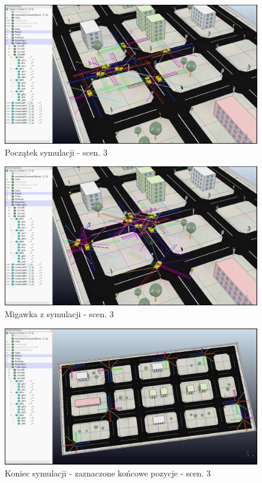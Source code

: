  \begin{figure}[H]
 	\centering
 	\centering
 	\includegraphics[width=.8\linewidth]{p31.jpg}
 	\caption{Początek symulacji - scen. 3}
 	\label{fig:p31}
 \end{figure}

 \begin{figure}[H]
	\centering
	\centering
	\includegraphics[width=.8\linewidth]{p32.jpg}
	\caption{Migawka z symulacji - scen. 3}
	\label{fig:p32}
\end{figure}

 \begin{figure}[H]
	\centering
	\centering
	\includegraphics[width=.8\linewidth]{p33.jpg}
	\caption{Koniec symulacji - zaznaczone końcowe pozycje - scen. 3}
	\label{fig:p33}
\end{figure}
 
 
